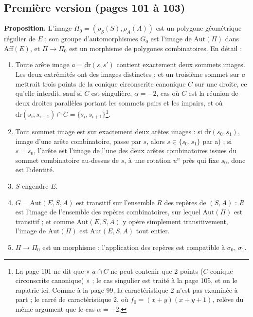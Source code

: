 \documentclass[11pt,a4paper]{article}
\begin{document}
\subsection*{Première version (pages 101 à 103)}

\textbf{Proposition.} L'image $\Pi_0 = (\rho_S(S), \rho_A(A))$ est un polygone
géométrique régulier de $E$ ; son groupe d'automorphismes $G_0$ est l'image de
$\mathrm{Aut}(\Pi)$ dans $\mathrm{Aff}(E)$, et $\Pi \to \Pi_0$ est un
morphisme de polygones combinatoires. En détail :
\begin{enumerate}
  \item[a)] Toute arête image $a = \mathrm{dr}(s, s')$ contient exactement deux
    sommets images. Les deux extrémités ont des images distinctes ; et un
    troisième sommet sur $a$ mettrait trois points de la conique circonscrite
    canonique $C$ sur une droite, ce qu'elle interdit, sauf si $C$ est
    singulière, $\alpha = -2$, cas où $C$ est la réunion de deux droites
    parallèles portant les sommets pairs et les impairs, et où
    $\mathrm{dr}(s_i, s_{i+1}) \cap C = \{s_i, s_{i+1}\}$\footnote{La page 101
    ne dit que « $a \cap C$ ne peut contenir que 2 points ($C$ conique
    circonscrite canonique) » ; le cas singulier est traité à la page 105, et
    on le rapatrie ici. Comme à la page 99, la caractéristique $2$ n'est pas
    examinée à part ; le carré de caractéristique $2$, où $f_0 = (x + y)(x +
    y + 1)$, relève du même argument que le cas $\alpha = -2$.}.
  \item[b)] Tout sommet image est sur exactement deux arêtes images : si
    $\mathrm{dr}(s_0, s_1)$, image d'une arête combinatoire, passe par $s$,
    alors $s \in \{s_0, s_1\}$ par a) ; si $s = s_0$, l'arête est l'image de
    l'une des deux arêtes combinatoires issues du sommet combinatoire au-dessus
    de $s$, à une rotation $u^n$ près qui fixe $s_0$, donc est l'identité.
  \item[c)] $S$ engendre $E$.
  \item[d)] $G = \mathrm{Aut}(E, S, A)$ est transitif sur l'ensemble $R$ des
    repères de $(S, A)$ : $R$ est l'image de l'ensemble des repères
    combinatoires, sur lequel $\mathrm{Aut}(\Pi)$ est transitif ; et comme
    $\mathrm{Aut}(E, S, A)$ y opère simplement transitivement, l'image de
    $\mathrm{Aut}(\Pi)$ est $\mathrm{Aut}(E, S, A)$ tout entier.
  \item[e)] $\Pi \to \Pi_0$ est un morphisme : l'application des repères est
    compatible à $\sigma_0$, $\sigma_1$.
\end{enumerate}
\end{document}
